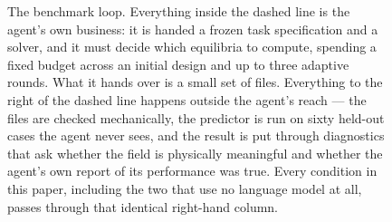 \begin{figure}[t]
{%
}
\caption{The benchmark loop. Everything inside the dashed line is the agent's
own business: it is handed a frozen task specification and a solver, and it must
decide which equilibria to compute, spending a fixed budget across an initial
design and up to three adaptive rounds. What it hands over is a small set of
files. Everything to the right of the dashed line happens outside the agent's
reach --- the files are checked mechanically, the predictor is run on sixty
held-out cases the agent never sees, and the result is put through diagnostics
that ask whether the field is physically meaningful and whether the agent's own
report of its performance was true. Every condition in this paper, including
the two that use no language model at all, passes through that identical
right-hand column.}
\label{fig:loop}
\end{figure}